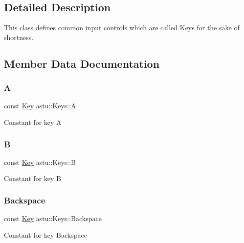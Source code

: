\subsection{Detailed Description}
This class defines common input controls which are called \hyperlink{classastu_1_1Keys}{Keys} for the sake of shortness. 

\subsection{Member Data Documentation}
\mbox{\label{classastu_1_1Keys_a1b8f7886f9aa0118a92ef52a9e8407e8}} 
\subsubsection{\texorpdfstring{A}{A}}
{\footnotesize\ttfamily const \hyperlink{classastu_1_1Key}{Key} astu\+::\+Keys\+::A\hspace{0.3cm}{\ttfamily [static]}}

Constant for key \textquotesingle{}A\textquotesingle{} \mbox{\label{classastu_1_1Keys_a5df053ae26815cea5e9207eeee2a3ae8}} 
\subsubsection{\texorpdfstring{B}{B}}
{\footnotesize\ttfamily const \hyperlink{classastu_1_1Key}{Key} astu\+::\+Keys\+::B\hspace{0.3cm}{\ttfamily [static]}}

Constant for key \textquotesingle{}B\textquotesingle{} \mbox{\label{classastu_1_1Keys_a6eeece1cb8f20622e818e2799667795e}} 
\subsubsection{\texorpdfstring{Backspace}{Backspace}}
{\footnotesize\ttfamily const \hyperlink{classastu_1_1Key}{Key} astu\+::\+Keys\+::\+Backspace\hspace{0.3cm}{\ttfamily [static]}}

Constant for key \textquotesingle{}Backspace\textquotesingle{} \mbox{\label{classastu_1_1Keys_a9000350684fb93a0947042fdd43c0387}} 
